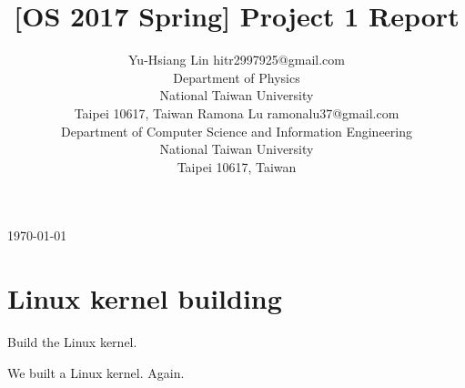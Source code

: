 \documentclass[twoside, 11pt, tablecaption=bottom]{article}
\begin{document}
\today

\title{[OS 2017 Spring] Project 1 Report}

\author{%
	\name Yu-Hsiang Lin \email hitr2997925@gmail.com \\
	\addr Department of Physics\\
	National Taiwan University\\
	Taipei 10617, Taiwan
	\AND
	\name Ramona Lu \email ramonalu37@gmail.com \\
	\addr Department of Computer Science and Information Engineering\\
	National Taiwan University\\
	Taipei 10617, Taiwan
}


\maketitle










\section{Linux kernel building}

	Build the Linux kernel.
	
	We built a Linux kernel. Again.




\vskip 0.2in
%
\end{document}
